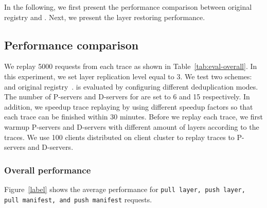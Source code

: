 
In the following, we first present the performance comparison between original registry and \sysname.
Next, we present the layer restoring performance.

\subsection{Performance comparison}
\label{sec:eval-dedup}


We replay 5000 requests from each trace as shown in Table~\ref{tab:eval-overall}.
In this experiment,
we set layer replication level equal to 3.
We test two schemes: \sysname and original registry~\cite{xxx}.
\sysname is evaluated by configuring different deduplication modes.
The number of P-servers and D-servers for \sysname are set to 6 and 15 respectively.
In addition, 
we speedup trace replaying by using different speedup factors
so that each trace can be finished within 30 minutes.
Before we replay each trace,
we first warmup P-servers and D-servers with different amount of layers according to the traces.
We use 100 clients distributed on client cluster to replay traces to P-servers and D-servers. 


\subsubsection{Overall performance}


Figure~\ref{label} shows the average performance for 
\texttt{pull layer, push layer, pull manifest, and push manifest}
requests.




